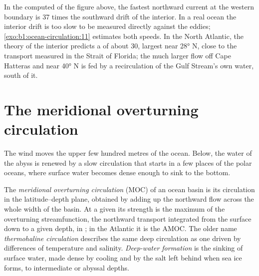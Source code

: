 In the computed  of the figure above, the fastest northward current at the
western boundary is 37 times the southward drift of the interior. In a real ocean
the interior drift is too slow to be measured directly against the eddies;
\cref{exo:b1:ocean-circulation:11} estimates both speeds.
In the North Atlantic, the theory of the interior predicts a  of about \qty{30}{\sverdrup}, largest near \ang{28} N, close to the transport
measured in the Strait of Florida; the much larger flow off Cape Hatteras and near
\ang{40} N is fed by a recirculation of the Gulf Stream's own water, south of it.

\section{The meridional overturning circulation}\label{sec:b1:ocean-circulation:moc}

The wind moves the upper few hundred metres of the ocean. Below, the water of the
abyss is renewed by a slow circulation that starts in a few places of the polar
oceans, where surface water becomes dense enough to sink to the bottom.

\begin{definition}\label{def:b1:ocean-circulation:moc}
The \emph{meridional overturning circulation} (MOC) of an ocean basin is its circulation in the latitude--depth plane,
obtained by adding up the northward flow across the whole width of the basin. At a
given  its strength is the maximum of the overturning streamfunction, the
northward transport integrated from the surface down to a given depth, in
; in the Atlantic it is the AMOC. The older name \emph{thermohaline
circulation} describes the same deep circulation as
one driven by differences of temperature and salinity. \emph{Deep-water
formation} is the sinking of surface water, made dense
by cooling and by the salt left behind when sea ice forms, to intermediate or abyssal
depths.
\end{definition}


